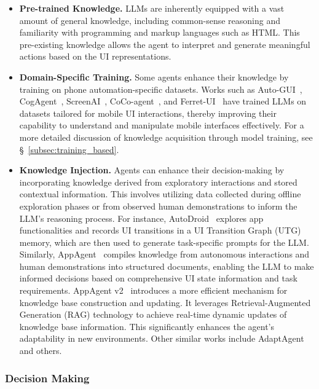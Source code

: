 \begin{itemize}
    \item \textbf{Pre-trained Knowledge.} LLMs are inherently equipped with a vast amount of general knowledge, including common-sense reasoning and familiarity with programming and markup languages such as HTML. This pre-existing knowledge allows the agent to interpret and generate meaningful actions based on the UI representations.
    
    \item \textbf{Domain-Specific Training.} Some agents enhance their knowledge by training on phone automation-specific datasets. Works such as Auto-GUI~\cite{zhang2023youautoui}, CogAgent~\cite{hong2024cogagent}, ScreenAI~\cite{baechler2024screenai}, CoCo-agent~\cite{ma2024coco}, and Ferret-UI~\cite{you2024ferret} have trained LLMs on datasets tailored for mobile UI interactions, thereby improving their capability to understand and manipulate mobile interfaces effectively. For a more detailed discussion of knowledge acquisition through model training, see \S\ \ref{subsec:training_based}.

    
    \item \textbf{Knowledge Injection.} Agents can enhance their decision-making by incorporating knowledge derived from exploratory interactions and stored contextual information. This involves utilizing data collected during offline exploration phases or from observed human demonstrations to inform the LLM's reasoning process. For instance, AutoDroid~\cite{wen2024autodroid} explores app functionalities and records UI transitions in a UI Transition Graph (UTG) memory, which are then used to generate task-specific prompts for the LLM. Similarly, AppAgent~\cite{zhang2023appagent} compiles knowledge from autonomous interactions and human demonstrations into structured documents, enabling the LLM to make informed decisions based on comprehensive UI state information and task requirements.
    AppAgent v2~\cite{li2024appagentv2} introduces a more efficient mechanism for knowledge base construction and updating. It leverages Retrieval-Augmented Generation (RAG) technology to achieve real-time dynamic updates of knowledge base information. This significantly enhances the agent's adaptability in new environments. Other similar works include AdaptAgent~\cite{verma2024adaptagent} and others.
\end{itemize}

\subsubsection{Decision Making}

